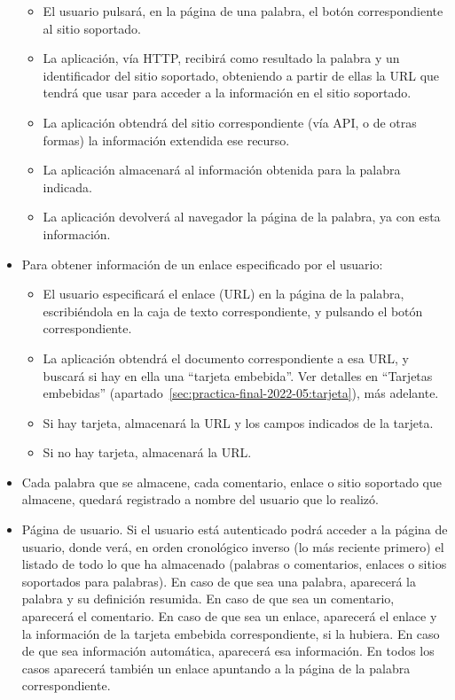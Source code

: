 \begin{itemize}
  \begin{itemize}
  \item El usuario pulsará, en la página de una palabra, el botón correspondiente al sitio soportado.
  \item La aplicación, vía HTTP, recibirá como resultado la palabra y un identificador del sitio soportado, obteniendo a partir de ellas la URL que tendrá que usar para acceder a la información en el sitio soportado.
  \item La aplicación obtendrá del sitio correspondiente (vía API, o de otras formas) la información extendida ese recurso.
  \item La aplicación almacenará al información obtenida para la palabra indicada.
  \item La aplicación devolverá al navegador la página de la palabra, ya con esta información.
  \end{itemize}

\item Para obtener información de un enlace especificado por el usuario:

  \begin{itemize}
  \item El usuario especificará el enlace (URL) en la página de la palabra, escribiéndola en la caja de texto correspondiente, y pulsando el botón correspondiente.
  \item La aplicación obtendrá el documento correspondiente a esa URL, y buscará si hay en ella una ``tarjeta embebida''. Ver detalles en ``Tarjetas embebidas'' (apartado~\ref{sec:practica-final-2022-05:tarjeta}), más adelante.
  \item Si hay tarjeta, almacenará la URL y los campos indicados de la tarjeta.
  \item Si no hay tarjeta, almacenará la URL.
  \end{itemize}

\item Cada palabra que se almacene, cada comentario, enlace o sitio soportado que almacene, quedará registrado a nombre del usuario que lo realizó.

\item Página de usuario. Si el usuario está autenticado podrá acceder a la página de usuario, donde verá, en orden cronológico inverso (lo más reciente primero) el listado de todo lo que ha almacenado (palabras o comentarios, enlaces o sitios soportados para palabras). En caso de que sea una palabra, aparecerá la palabra y su definición resumida. En caso de que sea un comentario, aparecerá el comentario. En caso de que sea un enlace, aparecerá el enlace y la información de la tarjeta embebida correspondiente, si la hubiera. En caso de que sea información automática, aparecerá esa información. En todos los casos aparecerá también un enlace apuntando a la página de la palabra correspondiente.


\end{itemize}
